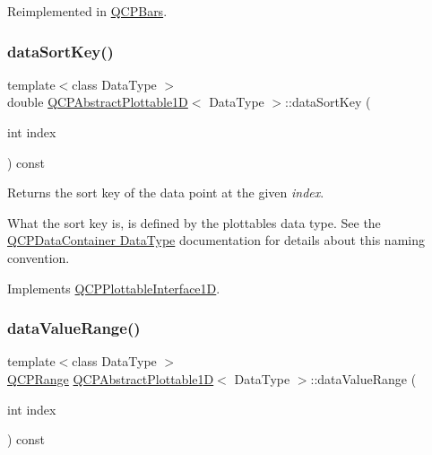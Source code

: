 Reimplemented in \hyperlink{class_q_c_p_bars_a55cdaf565cd3384158d1f7f89533bc2d}{Q\+C\+P\+Bars}.

\mbox{\label{class_q_c_p_abstract_plottable1_d_aa8277da921b009bce474437d50b4a2d8}} 
\subsubsection{\texorpdfstring{data\+Sort\+Key()}{dataSortKey()}}
{\footnotesize\ttfamily template$<$class Data\+Type $>$ \\
double \hyperlink{class_q_c_p_abstract_plottable1_d}{Q\+C\+P\+Abstract\+Plottable1D}$<$ Data\+Type $>$\+::data\+Sort\+Key (\begin{DoxyParamCaption}\item[{int}]{index }\end{DoxyParamCaption}) const\hspace{0.3cm}{\ttfamily [virtual]}}





Returns the sort key of the data point at the given {\itshape index}.

What the sort key is, is defined by the plottable\textquotesingle{}s data type. See the \hyperlink{class_q_c_p_data_container_qcpdatacontainer-datatype}{Q\+C\+P\+Data\+Container Data\+Type} documentation for details about this naming convention. 

Implements \hyperlink{class_q_c_p_plottable_interface1_d_afdc92f9f01e7e35f2e96b2ea9dc14ae7}{Q\+C\+P\+Plottable\+Interface1D}.

\mbox{\label{class_q_c_p_abstract_plottable1_d_a55f937ba6a63e56e57f0b1a6e85a333a}} 
\subsubsection{\texorpdfstring{data\+Value\+Range()}{dataValueRange()}}
{\footnotesize\ttfamily template$<$class Data\+Type $>$ \\
\hyperlink{class_q_c_p_range}{Q\+C\+P\+Range} \hyperlink{class_q_c_p_abstract_plottable1_d}{Q\+C\+P\+Abstract\+Plottable1D}$<$ Data\+Type $>$\+::data\+Value\+Range (\begin{DoxyParamCaption}\item[{int}]{index }\end{DoxyParamCaption}) const\hspace{0.3cm}{\ttfamily [virtual]}}





